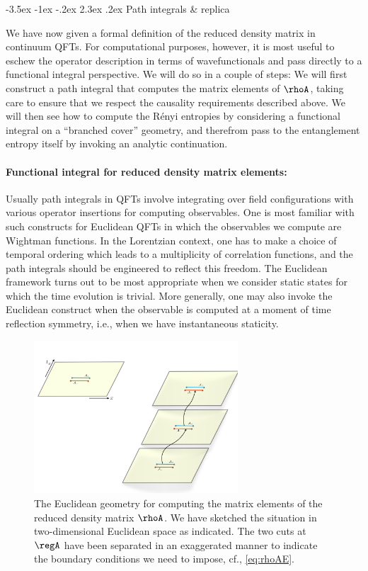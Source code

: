 \documentclass[12pt,openany]{book}
\makeatletter
\renewcommand\section{\@startsection {section}{1}{\z@}%
                                   {-3.5ex \@plus -1ex \@minus -.2ex}%
                                   {2.3ex \@plus.2ex}%
                                   {\normalfont\large\bfseries}}
\makeatother
\begin{document}
\section{Path integrals \& replica}
\label{sec:pi}

We have now given a formal definition of the reduced density matrix in continuum QFTs. For computational purposes, however, it is most useful to eschew the operator description in terms of wavefunctionals and pass directly to a functional integral perspective. We will do so in a couple of steps: We will first construct a path integral that computes  the matrix elements of $\rhoA$, taking care to ensure that we respect the causality requirements  described above. We will then see how to compute the R\'enyi entropies by considering a functional integral on a ``branched cover'' geometry, and therefrom pass to the entanglement entropy itself by invoking an analytic continuation.

\paragraph{Functional integral for reduced density matrix elements:} Usually path integrals in QFTs involve integrating over field configurations with various operator insertions for computing observables. One is most familiar with such constructs for Euclidean QFTs in which the observables we compute are Wightman functions. In the Lorentzian context, one has to make a choice of temporal ordering which leads to a multiplicity of correlation functions, and the path integrals should be engineered to reflect this freedom. The Euclidean framework turns out to be most appropriate when we consider static states for which the time evolution is trivial. More generally, one may also invoke the Euclidean construct when the observable is computed at a moment of time reflection symmetry, i.e., when we have instantaneous staticity.


\begin{figure}[htbp]
\begin{center}
\includegraphics[width=3in]{figures/rhopm}
\caption{ The Euclidean geometry for computing the matrix elements of the reduced density matrix $\rhoA$. We have sketched the situation in two-dimensional Euclidean space as indicated. The two cuts at $\regA$ have been separated in an exaggerated manner to indicate the boundary conditions we need to impose, cf., \eqref{eq:rhoAE}.}
\label{f:rhopmE}
\end{center}
\end{figure}
%
\end{document}
